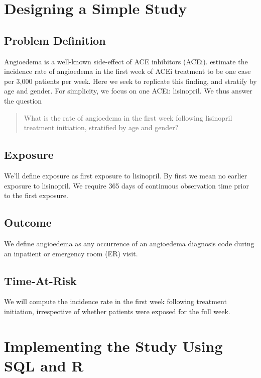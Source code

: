 \documentclass[11pt]{book}
\theoremstyle{definition}
\theoremstyle{definition}
\theoremstyle{definition}
\theoremstyle{remark}
\begin{document}
\section{Designing a Simple Study}\label{designing-a-simple-study}

\subsection{Problem Definition}\label{problem-definition}

Angioedema is a well-known side-effect of ACE inhibitors (ACEi).
\citet{slater_1988} estimate the incidence rate of angioedema in the
first week of ACEi treatment to be one case per 3,000 patients per week.
Here we seek to replicate this finding, and stratify by age and gender.
For simplicity, we focus on one ACEi: lisinopril. We thus answer the
question

\begin{quote}
What is the rate of angioedema in the first week following lisinopril
treatment initiation, stratified by age and gender?
\end{quote}

\subsection{Exposure}\label{exposure}

We'll define exposure as first exposure to lisinopril. By first we mean
no earlier exposure to lisinopril. We require 365 days of continuous
observation time prior to the first exposure.

\subsection{Outcome}\label{outcome}

We define angioedema as any occurrence of an angioedema diagnosis code
during an inpatient or emergency room (ER) visit.

\subsection{Time-At-Risk}\label{time-at-risk}

We will compute the incidence rate in the first week following treatment
initiation, irrespective of whether patients were exposed for the full
week.

\section{Implementing the Study Using SQL and
R}\label{implementing-the-study-using-sql-and-r}
\end{document}
